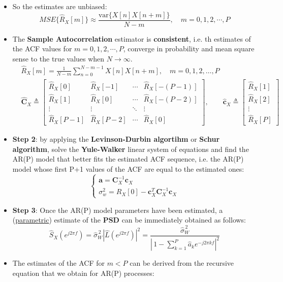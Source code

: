 \begin{itemize}
\item So the estimates are unbiased:
\[
MSE\{\hat{R}_X[m]\}\approx \frac{\text{var}\{X[n]X[n+m]\}}{N-m},\quad m=0,1,2,\cdots ,P
\]
\item The \textbf{Sample Autocorrelation }estimator is \textbf{consistent}, i.e. th estimates of the ACF values for \(m=0,1,2,\cdots,P\), converge in probability and mean square sense to the true values when \(N\rightarrow \infty\).
\begin{align*}
&\hat{R}_X[m] = \frac{1}{N-m}\sum_{n=0}^{N-m-1} X[n]X[n+m], \quad m = 0,1,2,\dots,P \\[10pt]
&\hat{\mathbf{C}}_X \triangleq
\begin{bmatrix}
\hat{R}_X[0]   & \hat{R}_X[-1]   & \cdots & \hat{R}_X[-(P-1)] \\
\hat{R}_X[1]   & \hat{R}_X[0]    & \cdots & \hat{R}_X[-(P-2)] \\
\vdots         & \vdots          & \ddots & \vdots            \\
\hat{R}_X[P-1] & \hat{R}_X[P-2]  & \cdots & \hat{R}_X[0]
\end{bmatrix},
\qquad
\hat{\mathbf{c}}_X \triangleq
\begin{bmatrix}
\hat{R}_X[1] \\ \hat{R}_X[2] \\ \vdots \\ \hat{R}_X[P]
\end{bmatrix}
\end{align*}
\item \textbf{Step 2}: by applying the \textbf{Levinson-Durbin algortihm} or \textbf{Schur algorithm}, solve the \textbf{Yule-Walker} linear system of equations and find the AR(P) model that better fits the estimated ACF sequence, i.e. the AR(P) model whose first P+1 values of the ACF are equal to the estimated ones:
\[{\begin{cases}
\mathbf{a} = \mathbf{C}_X^{-1}\mathbf{c}_X \\[4pt]
\sigma_w^{2} = R_X[0] - \mathbf{c}_X^{T}\mathbf{C}_X^{-1}\mathbf{c}_X
\end{cases}}
\]
\item \textbf{Step 3}: Once the AR(P) model parameters have been estimated, a (\underline{parametric}) estimate of the \textbf{PSD} can be immediately obtained as follows:
\[\hat{S}_X\!\left(e^{j2\pi f}\right)
= \hat{\sigma}_W^{\,2}\left|\hat{L}\!\left(e^{j2\pi f}\right)\right|^{2}
= \frac{\hat{\sigma}_W^{\,2}}{\left|\,1-\displaystyle\sum_{k=1}^{P}\hat{a}_k e^{-j2\pi k f}\right|^{2}}
\]
\item The estimates of the ACF for \(m<P\) can be derived from the recursive equation that we obtain for AR(P) processes:

\end{itemize}
